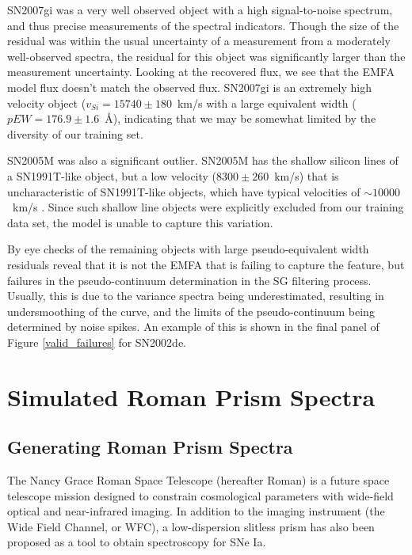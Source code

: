 SN2007gi was a very well observed object with a high signal-to-noise spectrum, and thus precise measurements of the spectral indicators. Though the size of the residual was within the usual uncertainty of a measurement from a moderately well-observed spectra, the residual for this object was significantly larger than the measurement uncertainty. Looking at the recovered flux, we see that the EMFA model flux doesn't match the observed flux. SN2007gi is an extremely high velocity object ($v_{Si}=15740\pm180$~km/s with a large equivalent width ($pEW=176.9\pm1.6$~\AA{}), indicating that we may be somewhat limited by the diversity of our training set.

SN2005M was also a significant outlier. SN2005M has the shallow silicon lines of a SN1991T-like object, but a low velocity ($8300\pm 260$~km/s) that is uncharacteristic of SN1991T-like objects, which have typical velocities of $\sim 10000$~km/s \citep{blondin_spectroscopic_2012}. Since such shallow line objects were explicitly excluded from our training data set, the model is unable to capture this variation.

By eye checks of the remaining objects with large pseudo-equivalent width residuals reveal that it is not the EMFA that is failing to capture the feature, but failures in the pseudo-continuum determination in the SG filtering process. Usually, this is due to the variance spectra being underestimated, resulting in undersmoothing of the curve, and the limits of the pseudo-continuum being determined by noise spikes. An example of this is shown in the final panel of Figure \ref{valid_failures} for SN2002de.

\section{Simulated Roman Prism Spectra}
\label{wfirst}
\subsection{Generating Roman Prism Spectra}
The Nancy Grace Roman Space Telescope (hereafter Roman) is a future space telescope mission designed to constrain cosmological parameters with wide-field optical and near-infrared imaging. In addition to the imaging instrument (the Wide Field Channel, or WFC), a low-dispersion slitless prism has also been proposed as a tool to obtain spectroscopy for SNe Ia.

